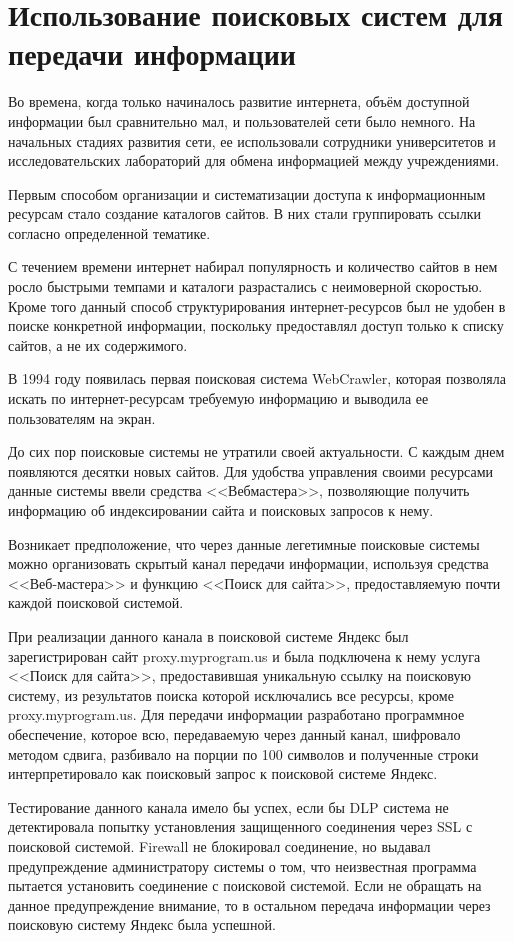 \section{Использование поисковых систем для передачи информации}

Во времена, когда только начиналось развитие интернета, объём доступной информации был сравнительно мал, и пользователей сети было немного. На начальных стадиях развития сети, ее использовали сотрудники университетов и исследовательских лабораторий для обмена информацией между учреждениями.

Первым способом организации и систематизации доступа к информационным ресурсам стало создание каталогов сайтов. В них стали группировать ссылки согласно определенной тематике.

С течением времени интернет набирал популярность и количество сайтов в нем росло быстрыми темпами и каталоги разрастались с неимоверной скоростью. Кроме того данный способ структурирования интернет-ресурсов был не удобен в поиске конкретной информации, поскольку предоставлял доступ только к списку сайтов, а не их содержимого.

В 1994 году появилась первая поисковая система WebCrawler, которая позволяла искать по интернет-ресурсам требуемую информацию и выводила ее пользователям на экран.

До сих пор поисковые системы не утратили своей актуальности. С каждым днем появляются десятки новых сайтов. Для удобства управления своими ресурсами данные системы ввели средства <<Вебмастера>>, позволяющие получить информацию об индексировании сайта и поисковых запросов к нему.

Возникает предположение, что через данные легетимные поисковые системы можно организовать скрытый канал передачи информации, используя средства <<Веб-мастера>> и функцию <<Поиск для сайта>>, предоставляемую почти каждой поисковой системой.

При реализации данного канала в поисковой системе Яндекс был зарегистрирован сайт proxy.myprogram.us и была подключена к нему услуга <<Поиск для сайта>>, предоставившая уникальную ссылку на поисковую систему, из результатов поиска которой исключались все ресурсы, кроме proxy.myprogram.us. Для передачи информации разработано программное обеспечение, которое всю, передаваемую через данный канал, шифровало методом сдвига, разбивало на порции по 100 символов и полученные строки интерпретировало как поисковый запрос к поисковой системе Яндекс.

Тестирование данного канала имело бы успех, если бы DLP система не детектировала попытку установления защищенного соединения через SSL с поисковой системой. Firewall не блокировал соединение, но выдавал предупреждение администратору системы о том, что неизвестная программа пытается установить соединение с поисковой системой. Если не обращать на данное предупреждение внимание, то в остальном передача информации через поисковую систему Яндекс была успешной.